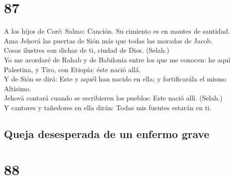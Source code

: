 \hypertarget{section-86}{%
\section{87}\label{section-86}}

 A los hijos de Coré: Salmo: Canción. Su cimiento es en
montes de santidad.\\
 Ama Jehová las puertas de Sión más que todas las moradas
de Jacob.\\
 Cosas ilustres son dichas de ti, ciudad de Dios.
(Selah.)\\
 Yo me acordaré de Rahab y de Babilonia entre los que me
conocen: he aquí Palestina, y Tiro, con Etiopía: éste nació allá.\\
 Y de Sión se dirá: Este y aquél han nacido en ella; y
fortificarála el mismo Altísimo.\\
 Jehová contará cuando se escribieren los pueblos: Este
nació allí. (Selah.)\\
 Y cantores y tañedores en ella dirán: Todas mis fuentes
estarán en ti.

\hypertarget{queja-desesperada-de-un-enfermo-grave}{%
\subsection{Queja desesperada de un enfermo
grave}\label{queja-desesperada-de-un-enfermo-grave}}

\hypertarget{section-87}{%
\section{88}\label{section-87}}


